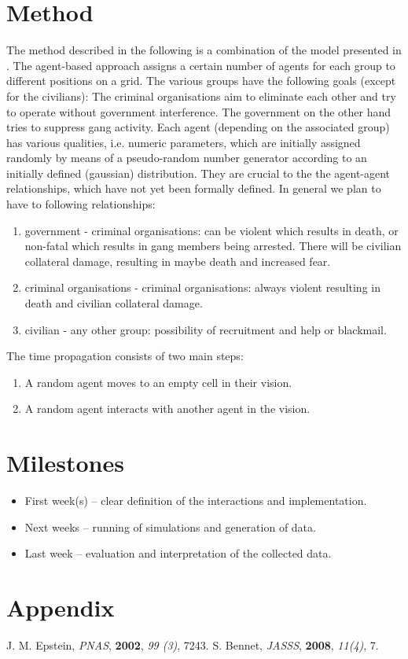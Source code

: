 \documentclass[8 pt]{scrartcl}
\begin{document}
\section{Method}
The method described in the following is a combination of the model presented in \cite{epstein, bennet}. The agent-based approach assigns a certain number of agents for each group to different positions on a grid. The various groups have the following goals (except for the civilians): The criminal organisations aim to eliminate each other and try to operate without government interference. The government on the other hand tries to suppress gang activity. Each agent (depending on the associated group) has various qualities, i.e. numeric parameters, which are initially assigned randomly by means of a pseudo-random number generator according to an initially defined (gaussian) distribution. They are crucial to the the agent-agent relationships, which have not yet been formally defined. In general we plan to have to following relationships:
\begin{enumerate}
\item government - criminal organisations: can be violent which results in death, or non-fatal which results in gang members being arrested. There will be civilian collateral damage, resulting in maybe death and increased fear. 
\item criminal organisations - criminal organisations: always violent resulting in death and civilian collateral damage.
\item civilian - any other group: possibility of recruitment and help or blackmail.
\end{enumerate}
The time propagation consists of two main steps: 
\begin{enumerate}
\item A random agent moves to an empty cell in their vision.
\item A random agent interacts with another agent in the vision. 
\end{enumerate}
\section{Milestones}
\begin{itemize}
\item First week(s) – clear definition of the interactions and implementation.
\item Next weeks – running of simulations and generation of data.
\item Last week – evaluation and interpretation of the collected data.
\end{itemize}


\section{Appendix}
\begin{thebibliography}{sotief}
 J. M. Epstein, \textit{PNAS}, \textbf{2002}, \textit{99 (3)}, 7243.
 S. Bennet, \textit{JASSS}, \textbf{2008}, \textit{11(4)}, 7.  
\end{thebibliography}
\end{document}
